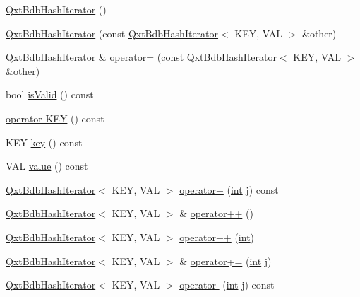 \begin{DoxyCompactItemize}
\item 
\hyperlink{class_qxt_bdb_hash_iterator_ac7fef3e6248b4f7a56280ee4e477f235}{Qxt\-Bdb\-Hash\-Iterator} ()
\item 
\hyperlink{class_qxt_bdb_hash_iterator_ac6179e339acfe49eb1863b3ff2607e13}{Qxt\-Bdb\-Hash\-Iterator} (const \hyperlink{class_qxt_bdb_hash_iterator}{Qxt\-Bdb\-Hash\-Iterator}$<$ K\-E\-Y, V\-A\-L $>$ \&other)
\item 
\hyperlink{class_qxt_bdb_hash_iterator}{Qxt\-Bdb\-Hash\-Iterator} \& \hyperlink{class_qxt_bdb_hash_iterator_aa1987322da3330354c2f8c6b0782f91a}{operator=} (const \hyperlink{class_qxt_bdb_hash_iterator}{Qxt\-Bdb\-Hash\-Iterator}$<$ K\-E\-Y, V\-A\-L $>$ \&other)
\item 
bool \hyperlink{class_qxt_bdb_hash_iterator_ab6cc51437fe9a4b050b942e02a450503}{is\-Valid} () const 
\item 
\hyperlink{class_qxt_bdb_hash_iterator_ac0e459b77770c1510ea4df18c47f789f}{operator K\-E\-Y} () const 
\item 
K\-E\-Y \hyperlink{class_qxt_bdb_hash_iterator_a27e2ee3d87f03e7ba412d4034fcc121b}{key} () const 
\item 
V\-A\-L \hyperlink{class_qxt_bdb_hash_iterator_a5c36d90173e6ed493201fd1f507f5d52}{value} () const 
\item 
\hyperlink{class_qxt_bdb_hash_iterator}{Qxt\-Bdb\-Hash\-Iterator}$<$ K\-E\-Y, V\-A\-L $>$ \hyperlink{class_qxt_bdb_hash_iterator_ac5e7da87855dd697b8a5b0365d3de7a7}{operator+} (\hyperlink{ioapi_8h_a787fa3cf048117ba7123753c1e74fcd6}{int} j) const 
\item 
\hyperlink{class_qxt_bdb_hash_iterator}{Qxt\-Bdb\-Hash\-Iterator}$<$ K\-E\-Y, V\-A\-L $>$ \& \hyperlink{class_qxt_bdb_hash_iterator_a0dade2186fee645096d530887d3fb641}{operator++} ()
\item 
\hyperlink{class_qxt_bdb_hash_iterator}{Qxt\-Bdb\-Hash\-Iterator}$<$ K\-E\-Y, V\-A\-L $>$ \hyperlink{class_qxt_bdb_hash_iterator_aabdef638b048b4def867a9cb23bbb365}{operator++} (\hyperlink{ioapi_8h_a787fa3cf048117ba7123753c1e74fcd6}{int})
\item 
\hyperlink{class_qxt_bdb_hash_iterator}{Qxt\-Bdb\-Hash\-Iterator}$<$ K\-E\-Y, V\-A\-L $>$ \& \hyperlink{class_qxt_bdb_hash_iterator_aaa562686169295ae0baa5eb465123208}{operator+=} (\hyperlink{ioapi_8h_a787fa3cf048117ba7123753c1e74fcd6}{int} j)
\item 
\hyperlink{class_qxt_bdb_hash_iterator}{Qxt\-Bdb\-Hash\-Iterator}$<$ K\-E\-Y, V\-A\-L $>$ \hyperlink{class_qxt_bdb_hash_iterator_a1ee93ac403d3d258c9e46fc6e2aedf48}{operator-\/} (\hyperlink{ioapi_8h_a787fa3cf048117ba7123753c1e74fcd6}{int} j) const 

\end{DoxyCompactItemize}
